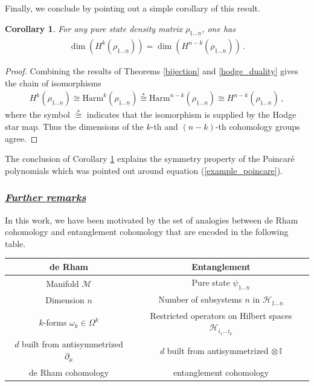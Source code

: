 \documentclass[12pt]{article}
\newtheorem{corollary}{Corollary}[section]
\newcommand{\ul}[1]{{\underline{#1}}}
\numberwithin{equation}{section}
\newcommand{\Honeton}{{\mathcal{H}_{\ul{1} \ldots \ul{n}}}}
\newcommand{\rhooneton}{{\rho_{\ul{1} \ldots \ul{n}}}}
\newcommand{\psioneton}{{\psi_{\ul{1} \ldots \ul{n}}}}
\begin{document}
Finally, we conclude by pointing out a simple corollary of this result.

\begin{corollary}\label{symmetry_corollary}
    For any pure state density matrix $\rhooneton$, one has
    \begin{align}
        \dim \left( H^k ( \rhooneton ) \right) = \dim \left( H^{n-k} ( \rhooneton ) \right) \, .
    \end{align}
\end{corollary}

\begin{proof}

Combining the results of Theorems \ref{bijection} and \ref{hodge_duality} gives the chain of isomorphisms
%
\begin{align}
    H^k ( \rhooneton ) \cong \mathrm{Harm}^k ( \rhooneton ) \overset{\ast}{\cong} \mathrm{Harm}^{n-k} ( \rhooneton ) \cong H^{n-k} ( \rhooneton ) \, ,
\end{align}
%
where the symbol $\overset{\ast}{\cong}$ indicates that the isomorphism is supplied by the Hodge star map. Thus the dimensions of the $k$-th and $(n-k)$-th cohomology groups agree.
\end{proof}

The conclusion of Corollary \ref{symmetry_corollary} explains the symmetry property of the Poincar\'e polynomials which was pointed out around equation (\ref{example_poincare}).

\subsubsection*{\ul{\it Further remarks}}

In this work, we have been motivated by the set of analogies between de Rham cohomology and entanglement cohomology that are encoded in the following table.

\begin{center}
\begin{tabular}{||c | c ||} 
 \hline
 de Rham & Entanglement  \\ [0.5ex] 
 \hline\hline
 Manifold $\mathcal{M}$ & Pure state $\psioneton$ \\ 
 \hline
 Dimension $n$ & Number of subsystems $n$ in $\Honeton$ \\
 \hline
 $k$-forms $\omega_k \in \Omega^k$ & Restricted operators on Hilbert spaces $\mathcal{H}_{\ul{i}_1 \ldots \ul{i}_k}$ \\
 \hline
 $d$ built from antisymmetrized $\partial_\mu$ & $d$ built from antisymmetrized $\otimes \, \mathbb{I}$  \\
 \hline
 de Rham cohomology & entanglement cohomology \\ [1ex] 
 \hline
\end{tabular}
\end{center}
\end{document}
